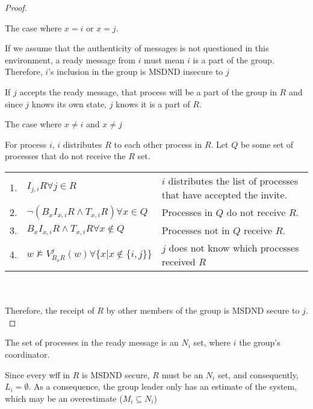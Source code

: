 \begin{proof}
\begin{case}
    The case where $x = i$ or $x = j$.
\end{case}

If we assume that the authenticity of messages is not questioned in this environment, a ready message from $i$ must mean $i$ is a part of the group.
Therefore, $i$'s inclusion in the group is MSDND insecure to $j$

If $j$ accepts the ready message, that process will be a part of the group in $R$ and since $j$ knows its own state, $j$ knows it is a part of $R$.

\begin{case}
    The case where $x \neq i$ and $x \neq j$
\end{case}

For process $i$, $i$ distributes $R$ to each other process in $R$.
Let $Q$ be some set of processes that do not receive the $R$ set.

\begin{table}[h!]
\centering
\small
\begin{tabularx}{\linewidth}{l X X}
1. & $I_{j,i} R \forall j \in R $ & $i$ distributes the list of processes that have accepted the invite.  \\
2. & $\neg(B_x I_{x,i} R \wedge T_{x,i} R) \forall x \in Q$ & Processes in $Q$ do not receive $R$. \\
3. & $B_x I_{x,i} R \wedge T_{x,i} R \forall x \not \in Q$ & Processes not in $Q$ receive $R$. \\
    4. & $w \not \vDash V_{B_x R}^{j}(w) \forall \{x | x \not \in \{i,j\}\}$ & $j$ does not know which processes received $R$ \\
\end{tabularx} \\~\\
Therefore, the receipt of $R$ by other members of the group is MSDND secure to $j$.
\label{tab:readynsetproof}
\end{table}
\end{proof}

\begin{cor}
    The set of processes in the ready message is an $N_i$ set, where $i$ the group's coordinator.
\end{cor}

Since every wff in $R$ is MSDND secure, $R$ must be an $N_i$ set, and consequently, $L_i = \emptyset$.
As a consequence, the group leader only has an estimate of the system, which may be an overestimate ($M_i \subseteq N_i$)

